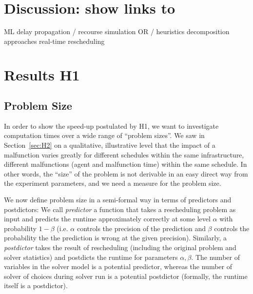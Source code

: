 \documentclass{article}
\begin{document}
\section{Discussion: show links to}
        ML
        delay propagation / recourse
        simulation
        OR / heuristics
        decomposition approaches
        real-time rescheduling


\section{Results H1}\label{sec:ResultsH1}


\subsection{Problem Size}

In order to show the speed-up postulated by H1, we want to investigate computation times over a wide range of ``problem sizes''. We saw in Section~\ref{sec:H2} on a qualitative, illustrative level that the impact of a malfunction varies greatly for different schedules within the same infrastructure, different malfunctions (agent and malfunction time) within the same schedule. In other words, the ``size'' of the problem is not derivable in an easy direct way from the experiment parameters, and we need a measure for the problem size.

We now define problem size in a semi-formal way in terms of predictors and postdictors:  We call \emph{predictor} a function that takes a rescheduling problem as input and predicts the runtime approximately correctly at some level $\alpha$ with probability $1-\beta$ (i.e. $\alpha$ controls the precision of the prediction and $\beta$ controls the probability the the prediction is wrong at the given precision).
Similarly, a \emph{postdictor} takes the result of rescheduling (including the original problem and solver statistics) and postdicts the runtime for parameters $\alpha,\beta$. The number of variables in the solver model is a potential predictor, whereas the number of solver of choices during solver run is a potential postdictor (formally, the runtime itself is a postdictor).
\end{document}
